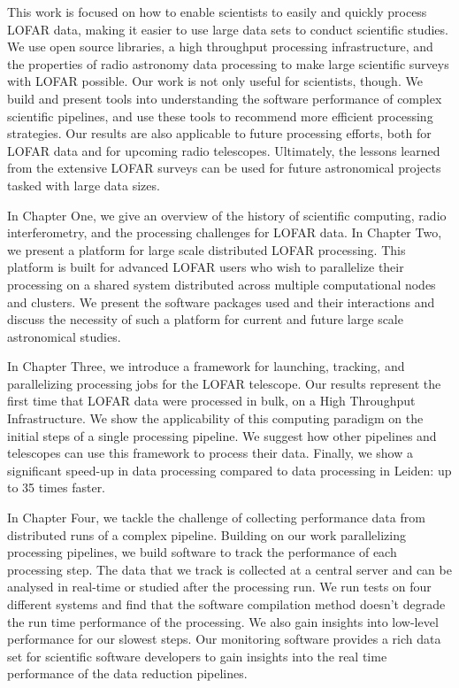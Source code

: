 This work is focused on how to enable scientists to easily and quickly process LOFAR data, making it easier to use large data sets to conduct scientific studies. We use open source libraries, a high throughput processing infrastructure, and the properties of radio astronomy data processing to make large scientific surveys with LOFAR possible. Our work is not only useful for scientists, though. We build and present tools into understanding the software performance of complex scientific pipelines, and use these tools to recommend more efficient processing strategies. Our results are also applicable to future processing efforts, both for LOFAR data and for upcoming radio telescopes. Ultimately, the lessons learned from the extensive LOFAR surveys can be used for future astronomical projects tasked with large data sizes.

In Chapter One, we give an overview of the history of scientific computing, radio interferometry, and the processing challenges for LOFAR data. In Chapter Two, we present a platform for large scale distributed LOFAR processing. This platform is built for advanced LOFAR users who wish to parallelize their processing on a shared system distributed across multiple computational nodes and clusters. We present the software packages used and their interactions and discuss the necessity of such a platform for current and future large scale astronomical studies. 

In Chapter Three, we introduce a framework for launching, tracking, and parallelizing processing jobs for the LOFAR telescope. Our results represent the first time that LOFAR data were processed in bulk, on a High Throughput Infrastructure. We show the applicability of this computing paradigm on the initial steps of a single processing pipeline. We suggest how other pipelines and telescopes can use this framework to process their data.  Finally, we show a significant speed-up in data processing compared to data processing in Leiden: up to 35 times faster.

In Chapter Four, we tackle the challenge of collecting performance data from distributed runs of a complex pipeline. Building on our work parallelizing processing pipelines, we build software to track the performance of each processing step. The data that we track is collected at a central server and can be analysed in real-time or studied after the processing run. We run tests on four different systems and find that the software compilation method doesn't degrade the run time performance of the processing.  We also gain insights into low-level performance for our slowest steps. Our monitoring software provides a rich data set for scientific software developers to gain insights into the real time performance of the data reduction pipelines.  

